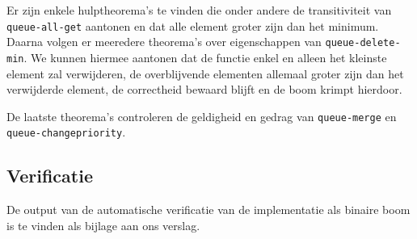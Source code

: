 \documentclass[a4paper,10pt]{article}
\begin{document}
Er zijn enkele hulptheorema's te vinden die onder andere de transitiviteit van
\texttt{queue-all-get} aantonen en dat alle element groter zijn dan het minimum.
Daarna volgen er meeredere theorema's over eigenschappen van
\texttt{queue-delete-min}. We kunnen hiermee aantonen dat de functie enkel en
alleen het kleinste element zal verwijderen, de overblijvende elementen allemaal
groter zijn dan het verwijderde element, de correctheid bewaard blijft en de
boom krimpt hierdoor.

De laatste theorema's controleren de geldigheid en gedrag van \texttt{queue-merge}
en \texttt{queue-change\-priority}.

\subsection{Verificatie}

De output van de automatische verificatie van de implementatie als binaire boom
is te vinden als bijlage aan ons verslag.
\end{document}
